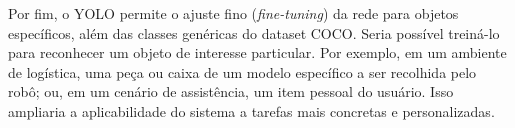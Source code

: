 Por fim, o YOLO permite o ajuste fino (\textit{fine-tuning}) da rede para objetos
específicos, além das classes genéricas do dataset COCO. Seria possível treiná-lo
para reconhecer um objeto de interesse particular. Por exemplo, em um ambiente de
logística, uma peça ou caixa de um modelo específico a ser recolhida pelo robô; ou,
em um cenário de assistência, um item pessoal do usuário. Isso ampliaria a
aplicabilidade do sistema a tarefas mais concretas e personalizadas.
